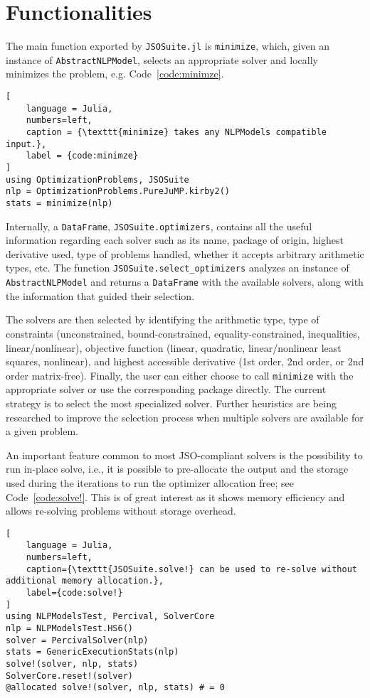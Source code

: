 \documentclass{juliacon}
\begin{document}
\section{Functionalities}

The main function exported by \texttt{JSOSuite.jl} is \texttt{minimize}, which, given an instance of \texttt{AbstractNLPModel}, selects an appropriate solver and locally minimizes the problem, e.g. Code~\ref{code:minimze}.

\begin{lstlisting}[
    language = Julia, 
    numbers=left,
    caption = {\texttt{minimize} takes any NLPModels compatible input.},
    label = {code:minimze}
]
using OptimizationProblems, JSOSuite
nlp = OptimizationProblems.PureJuMP.kirby2()
stats = minimize(nlp)

\end{lstlisting}

Internally, a \texttt{DataFrame}, \texttt{JSOSuite.optimizers}, contains all the useful information regarding each solver such as its name, package of origin, highest derivative used, type of problems handled, whether it accepts arbitrary arithmetic types, etc.
%
The function \texttt{JSOSuite.select\_optimizers} analyzes an instance of \texttt{AbstractNLPModel} and returns a \texttt{DataFrame} with the available solvers, along with the information that guided their selection.

The solvers are then selected by identifying the arithmetic type, type of constraints (unconstrained, bound-constrained, equality-constrained, inequalities, linear/nonlinear), objective function (linear, quadratic, linear/nonlinear least squares, nonlinear), and highest accessible derivative (1st order, 2nd order, or 2nd order matrix-free).
Finally, the user can either choose to call \texttt{minimize} with the appropriate solver or use the corresponding package directly.
%
The current strategy is to select the most specialized solver. Further heuristics are being researched to improve the selection process when multiple solvers are available for a given problem.

An important feature common to most JSO-compliant solvers is the possibility to run in-place solve, i.e., it is possible to pre-allocate the output and the storage used during the iterations to run the optimizer allocation free; see Code~\ref{code:solve!}.
This is of great interest as it shows memory efficiency and allows re-solving problems without storage overhead.
\begin{lstlisting}[
    language = Julia, 
    numbers=left,
    caption={\texttt{JSOSuite.solve!} can be used to re-solve without additional memory allocation.},
    label={code:solve!}
]
using NLPModelsTest, Percival, SolverCore
nlp = NLPModelsTest.HS6()
solver = PercivalSolver(nlp)
stats = GenericExecutionStats(nlp)
solve!(solver, nlp, stats)
SolverCore.reset!(solver)
@allocated solve!(solver, nlp, stats) # = 0
\end{lstlisting}
\end{document}
